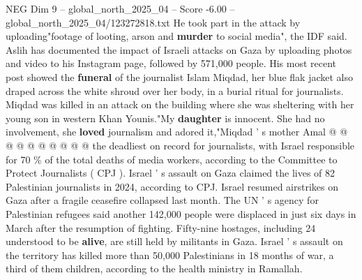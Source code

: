 \begin{textsample}{NEG Dim 9 – global\_north\_2025\_04 – Score -6.00 – global\_north\_2025\_04/123272818.txt}
He took part in the attack by uploading"footage of looting, arson and \textbf{murder} to social media", the IDF said.
Aslih has documented the impact of Israeli attacks on Gaza by uploading photos and video to his Instagram page, followed by 571,000 people.
His most recent post showed the \textbf{funeral} of the journalist Islam Miqdad, her blue flak jacket also draped across the white shroud over her body, in a burial ritual for journalists.
Miqdad was killed in an attack on the building where she was sheltering with her young son in western Khan Younis."My \textbf{daughter} is innocent.
She had no involvement, she \textbf{loved} journalism and adored it,"Miqdad ' s mother Amal @ @ @ @ @ @ @ @ @ @ the deadliest on record for journalists, with Israel responsible for 70 \% of the total deaths of media workers, according to the Committee to Protect Journalists ( CPJ ).
Israel ' s assault on Gaza claimed the lives of 82 Palestinian journalists in 2024, according to CPJ.
Israel resumed airstrikes on Gaza after a fragile ceasefire collapsed last month.
The UN ' s agency for Palestinian refugees said another 142,000 people were displaced in just six days in March after the resumption of fighting.
Fifty-nine hostages, including 24 understood to be \textbf{alive}, are still held by militants in Gaza.
Israel ' s assault on the territory has killed more than 50,000 Palestinians in 18 months of war, a third of them children, according to the health ministry in Ramallah.

\end{textsample}
